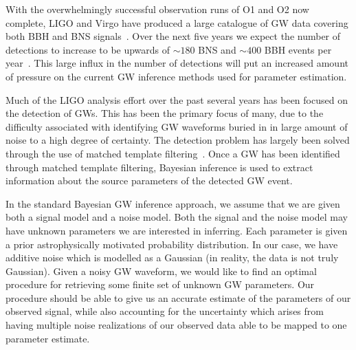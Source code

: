 \documentclass[%
showpacs,
 amsmath,amssymb,
 aps,
 twocolumn,
 prl,
 reprint,
floatfix,
]{revtex4-1}
\begin{document}
%
%
%
With the overwhelmingly successful observation runs of O1 and O2 now complete,
\ac{LIGO} and Virgo have produced a large catalogue of \ac{GW} data covering
both \ac{BBH} and \ac{BNS} signals~\cite{1811.12907}. Over the next five years
we expect the number of detections to increase to be upwards of $\sim180$
\ac{BNS} and $\sim400$ BBH events per year~\cite{1304.0670,1811.12907}. This
large influx in the number of detections will put an increased amount of
pressure on the current \ac{GW} inference methods used for parameter
estimation.  

%
%
Much of the \ac{LIGO} analysis effort over the past several years has been
focused on the detection of \acp{GW}. This has been the primary focus of many,
due to the difficulty associated with identifying \ac{GW} waveforms buried in
in large amount of noise to a high degree of certainty. The detection problem
has largely been solved through the use of matched template
filtering~\cite{0264-9381-33-21-215004}. Once a \ac{GW} has been identified
through matched template filtering, Bayesian inference is used to extract
information about the source parameters of the detected \ac{GW} event.

%
%
In the standard Bayesian \ac{GW} inference approach, we assume that we are
given both a signal model and a noise model. Both the signal and the 
noise model may have unknown parameters we are interested in inferring. 
Each parameter is given a prior astrophysically motivated probability 
distribution. In our case, we have additive noise which is modelled as 
a Gaussian (in reality, the data is not truly Gaussian). Given a noisy
\ac{GW} waveform, we would like to find an optimal procedure for retrieving
some finite set of unknown \ac{GW} parameters. Our procedure should be able
to give us an accurate estimate of the parameters of our observed signal, while
also accounting for the uncertainty which arises from having multiple noise
realizations of our observed data able to be mapped to one parameter
estimate.
\end{document}
